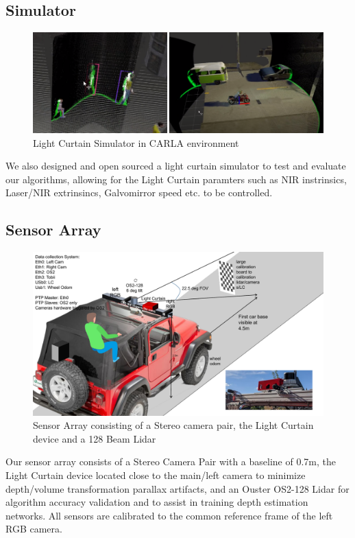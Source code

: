 \subsection{Simulator}

\begin{figure}[h]
   \centering
   \begin{minipage}{0.5\textwidth}
       \centering
       \includegraphics[width=1.0\textwidth]{figures/sim.png}
   \end{minipage}\hfill
   \centering
   \caption{Light Curtain Simulator in CARLA environment}
\end{figure}

We also designed and open sourced a light curtain simulator to test and evaluate our algorithms, allowing for the Light Curtain paramters such as NIR instrinsics, Laser/NIR extrinsincs, Galvomirror speed etc. to be controlled.

\subsection{Sensor Array}

\begin{figure}[h]
   \centering
   \begin{minipage}{0.5\textwidth}
       \centering
       \includegraphics[width=1.0\textwidth]{figures/array.pdf}
   \end{minipage}\hfill
   \centering
   \caption{Sensor Array consisting of a Stereo camera pair, the Light Curtain device and a 128 Beam Lidar}
\end{figure}

Our sensor array consists of a Stereo Camera Pair with a baseline of 0.7m, the Light Curtain device located close to the main/left camera to minimize depth/volume transformation parallax artifacts, and an Ouster OS2-128 Lidar for algorithm accuracy validation and to assist in training depth estimation networks. All sensors are calibrated to the common reference frame of the left RGB camera.